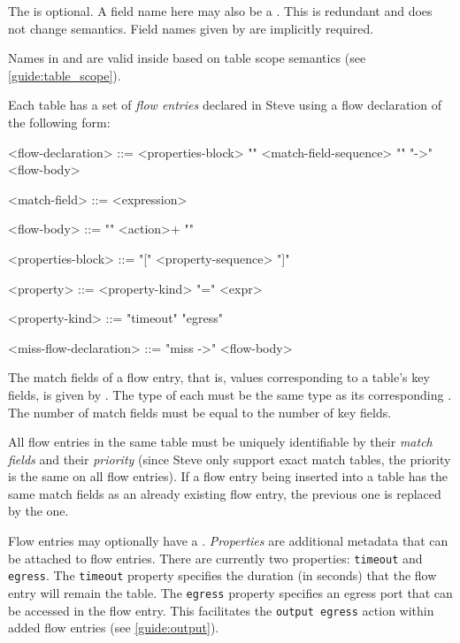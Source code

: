 The  is optional. A field name here may also be a . This is redundant and does not change semantics. Field names given by  are implicitly required.

Names in  and  are valid inside  based on table scope semantics (see \ref{guide:table_scope}).

Each table has a set of \textit{flow entries} declared in Steve using a flow declaration of the following form:

\begin{minip}
\begin{grammar}
<flow-declaration> ::=
<properties-block>
"{" <match-field-sequence> "}" "->" <flow-body>

<match-field> ::= <expression>

<flow-body> ::= "{" <action>+ "}"

<properties-block> ::=
"[" <property-sequence> "]"

<property> ::=
<property-kind> "=" <expr>

<property-kind> ::=
"timeout"
\alt "egress"

<miss-flow-declaration> ::=
"miss ->" <flow-body>
\end{grammar}
\end{minip}

The match fields of a flow entry, that is, values corresponding to a table's key fields, is given by . The type of each  must be the same type as its corresponding . The number of match fields must be equal to the number of key fields.

All flow entries in the same table must be uniquely identifiable by their \textit{match fields} and their \textit{priority} (since Steve only support exact match tables, the priority is the same on all flow entries). If a flow entry being inserted into a table has the same match fields as an already existing flow entry, the previous one is replaced by the one.

Flow entries may optionally have a . \textit{Properties} are additional metadata that can be attached to flow entries. There are currently two properties: \texttt{timeout} and \texttt{egress}. The \texttt{timeout} property specifies the duration (in seconds) that the flow entry will remain the table. The \texttt{egress} property specifies an egress port that can be accessed in the flow entry. This facilitates the \texttt{output egress} action within added flow entries (see \ref{guide:output}).


